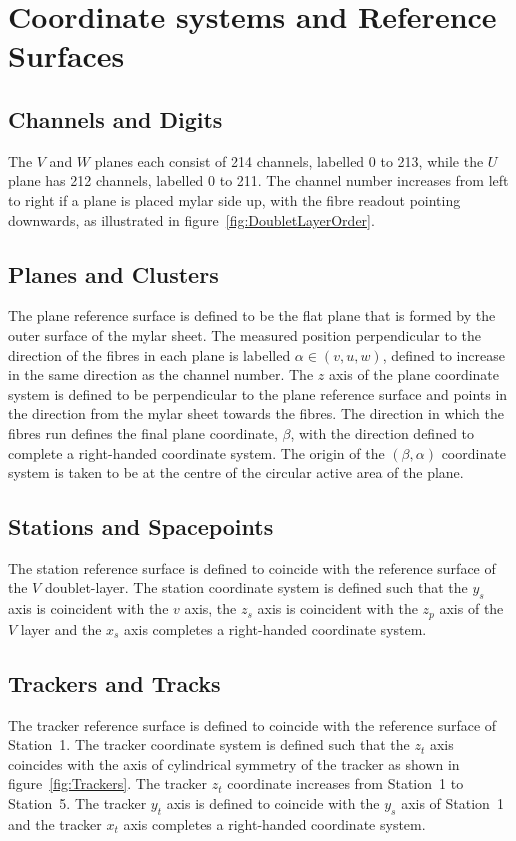 \section{Coordinate systems and Reference Surfaces}
\label{sec:Coordinates}

  \subsection{Channels and Digits}
  The $V$ and $W$ planes each consist of 214 channels, labelled 0 to 213, while the $U$ plane has 212 channels, labelled 0 to 211.  The channel number increases from left to right if a plane is placed mylar side up, with the fibre readout pointing downwards, as illustrated in figure~\ref{fig:DoubletLayerOrder}.

  \subsection{Planes and Clusters}
  The plane reference surface is defined to be the flat plane that is formed by the outer surface of the mylar sheet. The measured position perpendicular to the direction of the fibres in each plane is labelled  $\alpha \in (v, u, w)$, defined to increase in the same direction as the channel number.  The $z$ axis of the plane coordinate system is defined to be perpendicular to the plane reference surface and points in the direction from the mylar sheet towards the fibres. The direction in which the fibres run defines the final plane coordinate, $\beta$, with the direction defined to complete a right-handed coordinate system. The origin of the $(\beta, \alpha)$ coordinate system is taken to be at the centre of the circular active area of the plane.

  \subsection{Stations and Spacepoints}
  The station reference surface is defined to coincide with the reference surface of the $V$ doublet-layer. The station coordinate system is defined such that the $y_s$ axis is coincident with the $v$ axis, the $z_s$ axis is coincident with the $z_p$ axis of the $V$ layer and the $x_s$ axis completes a right-handed coordinate system.
 

  \subsection{Trackers and Tracks}
  The tracker reference surface is defined to coincide with the reference surface of Station~1. The tracker coordinate system is defined such that the $z_t$ axis coincides with the axis of cylindrical symmetry of the tracker as shown in figure~\ref{fig:Trackers}. The tracker $z_t$ coordinate increases from Station~1 to Station~5. The tracker $y_t$ axis is defined to coincide with the $y_s$ axis of Station~1 and the tracker $x_t$ axis completes a right-handed coordinate system. 
  
